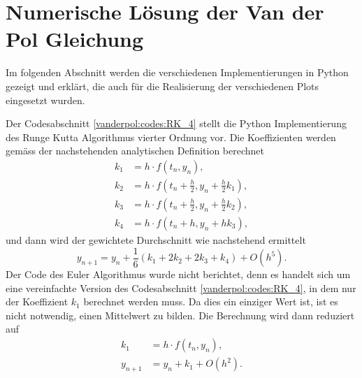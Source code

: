 %
%
%
\section{Numerische Lösung der Van der Pol Gleichung
\label{vanderpol:section:loesung}}
Im folgenden Abschnitt werden die verschiedenen Implementierungen in Python gezeigt und erklärt, die auch für die Realisierung der verschiedenen Plots eingesetzt wurden.

Der Codesabschnitt \ref{vanderpol:codes:RK_4} stellt die Python Implementierung des Runge Kutta Algorithmus vierter Ordnung vor. Die Koeffizienten werden gemäss der nachstehenden analytischen Definition berechnet
\begin{align*}
k_1 &= h \cdot f(t_n, y_n),\\
k_2 &= h \cdot f\left(t_n + \frac{h}{2}, y_n + \frac{h}{2} k_1\right), \\
k_3 &= h \cdot f\left(t_n + \frac{h}{2}, y_n + \frac{h}{2} k_2\right), \\
k_4 &= h \cdot f(t_n + h, y_n + h k_3),
\end{align*}
und dann wird der gewichtete Durchschnitt wie nachstehend ermittelt
\begin{equation}
y_{n+1} = y_n + \frac{1}{6}(k_1 + 2k_2 + 2k_3 + k_4) +O(h^5).
\end{equation}
Der Code des Euler Algorithmus wurde nicht berichtet, denn es handelt sich um eine vereinfachte Version des Codesabschnitt \ref{vanderpol:codes:RK_4}, in dem nur der Koeffizient $k_1$ berechnet werden muss. Da dies ein einziger Wert ist, ist es nicht notwendig, einen Mittelwert zu bilden. Die Berechnung wird dann reduziert auf
\begin{align*}
k_1 &= h \cdot f(t_n, y_n), \\
y_{n+1} &= y_n + k_1 +O(h^2).
\end{align*}

